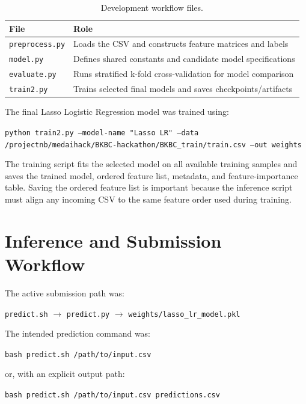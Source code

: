 \documentclass[11pt]{article}
\begin{document}
\begin{table}[h]
\centering
\begin{tabular}{ll}
\toprule
\textbf{File} & \textbf{Role} \\
\midrule
\texttt{preprocess.py} & Loads the CSV and constructs feature matrices and labels \\
\texttt{model.py} & Defines shared constants and candidate model specifications \\
\texttt{evaluate.py} & Runs stratified k-fold cross-validation for model comparison \\
\texttt{train2.py} & Trains selected final models and saves checkpoints/artifacts \\
\bottomrule
\end{tabular}
\caption{Development workflow files.}
\label{tab:workflow}
\end{table}

The final Lasso Logistic Regression model was trained using:

\begin{center}
\texttt{python train2.py --model-name "Lasso LR" --data /projectnb/medaihack/BKBC-hackathon/BKBC\_train/train.csv --out weights}
\end{center}

The training script fits the selected model on all available training samples and saves the trained model, ordered feature list, metadata, and feature-importance table. Saving the ordered feature list is important because the inference script must align any incoming CSV to the same feature order used during training.


\section{Inference and Submission Workflow}

The active submission path was:

\begin{center}
\texttt{predict.sh} $\rightarrow$ \texttt{predict.py} $\rightarrow$ \texttt{weights/lasso\_lr\_model.pkl}
\end{center}

The intended prediction command was:

\begin{center}
\texttt{bash predict.sh /path/to/input.csv}
\end{center}

or, with an explicit output path:

\begin{center}
\texttt{bash predict.sh /path/to/input.csv predictions.csv}
\end{center}
\end{document}
